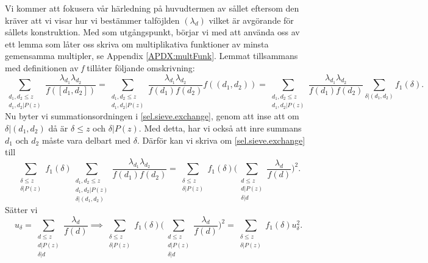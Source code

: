 Vi kommer att fokusera vår härledning på huvudtermen av sållet eftersom den kräver att vi visar hur vi bestämmer talföjlden \((\lambda_d)\) vilket är avgörande för sållets konstruktion.
 Med \cite[s. 120]{cojocarumurty} som utgångspunkt, börjar vi med att använda oss av ett lemma som låter oss skriva om multiplikativa funktioner av minsta gemensamma multipler, se Appendix \ref{APDX:multFunk}.
Lemmat tillsammans med definitionen av \textit{f} tillåter följande omskrivning:
\begin{equation}
    \sum_{\substack{d_1,d_2\leq z\\d_1,d_2|P(z)}}\frac{\lambda_{d_1}\lambda_{d_2}}{f([d_1,d_2])} = \sum_{\substack{d_1,d_2\leq z\\d_1,d_2|P(z)}}\frac{\lambda_{d_1}\lambda_{d_2}}{f(d_1)f(d_2)}f((d_1,d_2)) = \sum_{\substack{d_1,d_2\leq z\\d_1,d_2|P(z)}}\frac{\lambda_{d_1}\lambda_{d_2}}{f(d_1)f(d_2)}\sum_{\delta|(d_1,d_2)}f_1(\delta).\label{sel.sieve.exchange}
\end{equation}
Nu byter vi summationsordningen i \eqref{sel.sieve.exchange}, genom att inse att om \(\delta|(d_1,d_2)\) då är \(\delta \leq z\) och \(\delta | P(z)\).
Med detta, har vi också att inre summans \(d_1\) och \(d_2\) måste vara delbart med \(\delta\). Därför kan vi skriva om \eqref{sel.sieve.exchange} till
\begin{equation}
    \sum_{\substack{\delta \leq z\\ \delta | P(z)}}f_1(\delta) \sum_{\substack{d_1,d_2\leq z\\d_1,d_2|P(z)\\\delta|(d_1,d_2)}}\frac{\lambda_{d_1}\lambda_{d_2}}{f(d_1)f(d_2)} = \sum_{\substack{\delta \leq z\\ \delta | P(z)}}f_1(\delta)\Bigg(\sum_{\substack{d\leq z\\d|P(z)\\\delta|d}}\frac{\lambda_d}{f(d)}\Bigg)^2.\nonumber
\end{equation}
Sätter vi 
\begin{equation}
u_\delta = \sum_{\substack{d\leq z \\ d|P(z) \\ \delta | d}} \frac{\lambda_d}{f(d)} \implies \sum_{\substack{\delta \leq z\\ \delta | P(z)}}f_1(\delta)\Bigg(\sum_{\substack{d\leq z\\d|P(z)\\\delta|d}}\frac{\lambda_d}{f(d)}\Bigg)^2 = \sum_{\substack{\delta \leq z\\ \delta | P(z)}}f_1(\delta) u_\delta^2\label{sel.sieve.uuu}.
\end{equation}
